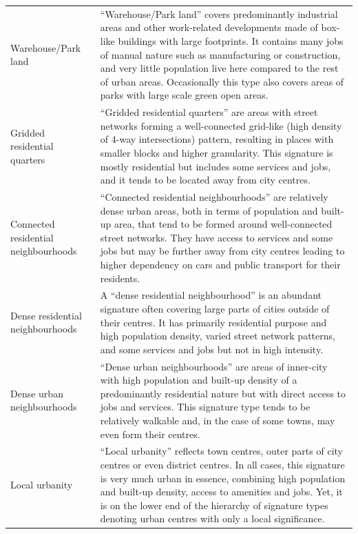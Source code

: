 \documentclass[fleqn,10pt]{wlscirep}
\begin{document}
\begin{longtable}{p{}p{}}
    Warehouse/Park land                  &                                “Warehouse/Park land” covers predominantly industrial areas and other work-related developments made of box-like buildings with large footprints. It contains many jobs of manual nature such as manufacturing or construction, and very little population live here compared to the rest of urban areas. Occasionally this type also covers areas of parks with large scale green open areas. \\
    Gridded residential quarters         &                                                                                  “Gridded residential quarters” are areas with street networks forming a well-connected grid-like (high density of 4-way intersections) pattern, resulting in places with smaller blocks and higher granularity. This signature is mostly residential but includes some services and jobs, and it tends to be located away from city centres. \\
    Connected residential neighbourhoods &                                                                     “Connected residential neighbourhoods” are relatively dense urban areas, both in terms of population and built-up area, that tend to be formed around well-connected street networks. They have access to services and some jobs but may be further away from city centres leading to higher dependency on cars and public transport for their residents. \\
    Dense residential neighbourhoods     &                                                                                                                                           A “dense residential neighbourhood” is an abundant signature often covering large parts of cities outside of their centres. It has primarily residential purpose and high population density, varied street network patterns, and some services and jobs but not in high intensity. \\
    Dense urban neighbourhoods           &                                                                                                                            “Dense urban neighbourhoods” are areas of inner-city with high population and built-up density of a predominantly residential nature but with direct access to jobs and services. This signature type tends to be relatively walkable and, in the case of some towns, may even form their centres. \\
    Local urbanity                       &                                                                “Local urbanity” reflects town centres, outer parts of city centres or even district centres. In all cases, this signature is very much urban in essence, combining high population and built-up density, access to amenities and jobs. Yet, it is on the lower end of the hierarchy of signature types denoting urban centres with only a local significance. \\

\end{longtable}
\end{document}
